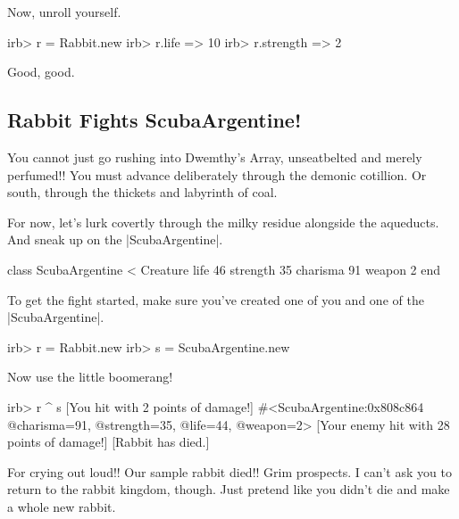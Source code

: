 \documentclass[12pt,twoside]{report}
\begin{document}
Now, unroll yourself.


\begin{consolecode}

 irb> r = Rabbit.new
 irb> r.life
   => 10
 irb> r.strength
   => 2

\end{consolecode}


Good, good.



\subsection{Rabbit Fights ScubaArgentine!}



You cannot just go rushing into Dwemthy's Array, unseatbelted and
merely perfumed!!  You must advance deliberately through the demonic
cotillion.  Or south, through the thickets and labyrinth of coal.

For now, let's lurk covertly through the milky residue alongside the
aqueducts.  And sneak up on the
\rubyinline|ScubaArgentine|.


\begin{rubycode}

 class ScubaArgentine < Creature
   life 46
   strength 35
   charisma 91
   weapon 2
 end

\end{rubycode}


To get the fight started, make sure you've created one of you and one
of the \rubyinline|ScubaArgentine|.


\begin{consolecode}

 irb> r = Rabbit.new
 irb> s = ScubaArgentine.new

\end{consolecode}


Now use the little boomerang!


\begin{consolecode}

 irb> r ^ s
 [You hit with 2 points of damage!]
 #<ScubaArgentine:0x808c864 @charisma=91, @strength=35, @life=44, @weapon=2>
 [Your enemy hit with 28 points of damage!]
 [Rabbit has died.]

\end{consolecode}


For crying out loud!!  Our sample rabbit died!!  Grim prospects.  I
can't ask you to return to the rabbit kingdom, though. Just pretend
like you didn't die and make a whole new rabbit.
\end{document}
